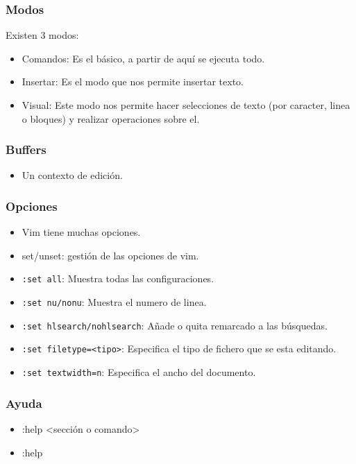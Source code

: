 \documentclass[10pt]{beamer}
\begin{document}

  \begin{frame}
    \frametitle{Modos}
  
    Existen 3 modos:
    \begin{itemize}
      \item Comandos: Es el básico, a partir de aquí se ejecuta todo.
      \item Insertar: Es el modo que nos permite insertar texto.
      \item Visual: Este modo nos permite hacer selecciones de texto (por caracter, linea o bloques) y realizar operaciones sobre el.
    \end{itemize}
  \end{frame}

  \begin{frame}
    \frametitle{Buffers}
  
    \begin{itemize}
      \item Un contexto de edición.
    \end{itemize}
  \end{frame}

  \begin{frame}[containsverbatim]
    \frametitle{Opciones}
  
    \begin{itemize}
      \item Vim tiene muchas opciones.
      \item set/unset: gestión de las opciones de vim.
      \item \verb+:set all+: Muestra todas las configuraciones.
      \item \verb+:set nu/nonu+: Muestra el numero de linea.
      \item \verb+:set hlsearch/nohlsearch+: Añade o quita remarcado a las búsquedas.
      \item \verb+:set filetype=<tipo>+: Especifica el tipo de fichero que se esta editando.
      \item \verb+:set textwidth=n+: Especifica el ancho del documento.
    \end{itemize}
  \end{frame}

  \begin{frame}
    \frametitle{Ayuda}
  
    \begin{itemize}
      \item :help <sección o comando>
      \item :help
    \end{itemize}
  \end{frame}
  
\end{document}
